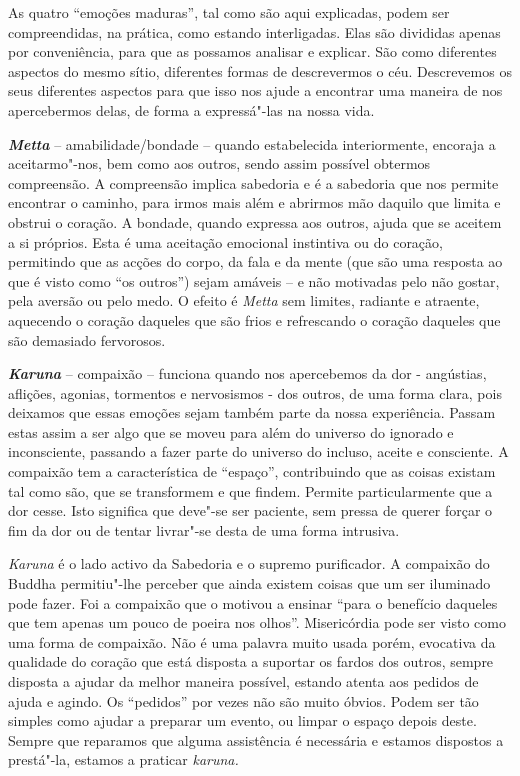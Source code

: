 As quatro ``emoções maduras'', tal como são aqui explicadas, podem ser
compreendidas, na prática, como estando interligadas. Elas são divididas
apenas por conveniência, para que as possamos analisar e explicar. São
como diferentes aspectos do mesmo sítio, diferentes formas de
descrevermos o céu. Descrevemos os seus diferentes aspectos para que
isso nos ajude a encontrar uma maneira de nos apercebermos delas, de
forma a expressá"-las na nossa vida.

\emph{\textbf{Metta}} -- amabilidade/bondade -- quando estabelecida
interiormente, encoraja a aceitarmo"-nos, bem como aos outros, sendo
assim possível obtermos compreensão. A compreensão implica sabedoria e é
a sabedoria que nos permite encontrar o caminho, para irmos mais além e
abrirmos mão daquilo que limita e obstrui o coração. A bondade, quando
expressa aos outros, ajuda que se aceitem a si próprios. Esta é uma
aceitação emocional instintiva ou do coração, permitindo que as acções
do corpo, da fala e da mente (que são uma resposta ao que é visto como
``os outros'') sejam amáveis -- e não motivadas pelo não gostar, pela
aversão ou pelo medo. O efeito é \emph{Metta} sem limites, radiante e
atraente, aquecendo o coração daqueles que são frios e refrescando o
coração daqueles que são demasiado fervorosos.

\emph{\textbf{Karuna}} -- compaixão -- funciona quando nos apercebemos da dor -
angústias, aflições, agonias, tormentos e nervosismos - dos outros, de
uma forma clara, pois deixamos que essas emoções sejam também parte da
nossa experiência. Passam estas assim a ser algo que se moveu para além
do universo do ignorado e inconsciente, passando a fazer parte do
universo do incluso, aceite e consciente. A compaixão tem a
característica de ``espaço'', contribuindo que as coisas existam tal
como são, que se transformem e que findem. Permite particularmente que a
dor cesse. Isto significa que deve"-se ser paciente, sem pressa de querer
forçar o fim da dor ou de tentar livrar"-se desta de uma forma intrusiva.

\emph{Karuna} é o lado activo da Sabedoria e o supremo purificador. A
compaixão do Buddha permitiu"-lhe perceber que ainda existem coisas que
um ser iluminado pode fazer. Foi a compaixão que o motivou a ensinar
``para o benefício daqueles que tem apenas um pouco de poeira nos
olhos''. Misericórdia pode ser visto como uma forma de compaixão. Não é
uma palavra muito usada porém, evocativa da qualidade do coração que
está disposta a suportar os fardos dos outros, sempre disposta a ajudar
da melhor maneira possível, estando atenta aos pedidos de ajuda e
agindo. Os ``pedidos'' por vezes não são muito óbvios. Podem ser tão
simples como ajudar a preparar um evento, ou limpar o espaço depois
deste. Sempre que reparamos que alguma assistência é necessária e
estamos dispostos a prestá"-la, estamos a praticar \emph{karuna.}


